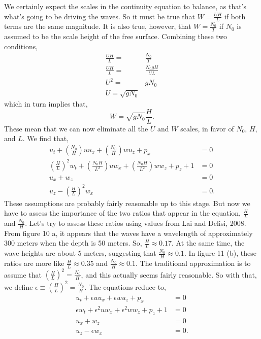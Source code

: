\documentclass[11pt]{article}
\begin{document}
We certainly expect the scales in the continuity equation to balance, as that's what's going to be driving the waves. So it must be true that $W=\frac{U H}{L}$ if both terms are the same magnitude. It is also true, however, that $W=\frac{N_0}{T}$ if $N_0$ is assumed to be the scale height of the free surface. Combining these two conditions,
\begin{align}
\frac{U H}{L} =& \frac{N_0}{T} \\
\frac{U H}{L} =& \frac{N_0 g H}{U L} \\
U^2 =& g N_0 \\
U = \sqrt{g N_0}
\end{align}
which in turn implies that,
\[
W = \sqrt{g N_0} \frac{H}{L}.
\]
These mean that we can now eliminate all the $U$ and $W$ scales, in favor of $N_0$, $H$, and $L$. We find that,
\begin{align}
u_t + \left( \frac{N_0}{H} \right)  u u_x + \left( \frac{N_0}{H} \right)  w u_z + p_x &=0 \\
\left( \frac{H}{L} \right)^2  w_t+ \left( \frac{N_0 H}{L^2} \right)  u w_x + \left( \frac{N_0 H}{L^2} \right)  w w_z + p_z + 1 &=0 \\
u_x +  w_z &= 0 \\
u_z - \left( \frac{H}{L} \right)^2  w_x &= 0.
\end{align}
These assumptions are probably fairly reasonable up to this stage. But now we have to assess the importance of the two ratios that appear in the equation, $\frac{H}{L}$ and $\frac{N_0}{H}$. Let's try to assess these ratios using values from Lai and Delisi, 2008. From figure 10 a, it appears that the waves have a wavelength of approximately 300 meters when the depth is 50 meters. So, $\frac{H}{L}\approx 0.17$. At the same time, the wave heights are about 5 meters, suggesting that $\frac{N_0}{H} \approx 0.1$. In figure 11 (b), these ratios are more like $\frac{H}{L}\approx 0.35$ and $\frac{N_0}{H} \approx 0.1$. The traditional approximation is to assume that $\left(\frac{H}{L}\right)^2=\frac{N_0}{H}$, and this actually seems fairly reasonable. So with that, we define $\epsilon \equiv \left(\frac{H}{L}\right)^2=\frac{N_0}{H}$. The equations reduce to,
\begin{align}
u_t +  \epsilon  u u_x + \epsilon w u_z + p_x &=0 \\
\epsilon  w_t+ \epsilon^2 u w_x + \epsilon^2  w w_z + p_z + 1 &=0 \\
u_x +  w_z &= 0 \\
u_z - \epsilon  w_x &= 0.
\end{align}
\end{document}
